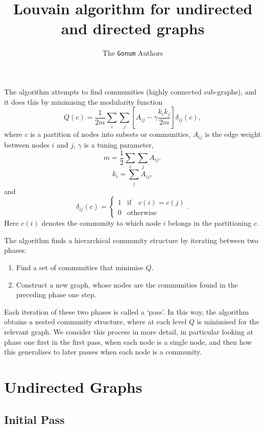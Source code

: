 \documentclass{article}
\title{Louvain algorithm for undirected and directed graphs}
\author{The {\tt Gonum} Authors}
\begin{document}
\maketitle

The algorithm attempts to find communities (highly connected sub-graphs),
and it does this by minimising the modularity function
\begin{equation}
	Q(c) = \frac{1}{2m}\sum_i\sum_j\left[ A_{ij} - \gamma \frac{k_ik_j}{2m} \right] \delta_{ij}(c),
\end{equation}
where $c$ is a partition of nodes into subsets or communities,
$A_{ij}$ is the edge weight between nodes $i$ and $j$, 
$\gamma$ is a tuning parameter,
\begin{equation}
m = \frac{1}{2}\sum_i\sum_jA_{ij},
\end{equation}
\begin{equation}
k_i = \sum_j{A_{ij}},
\end{equation}
and 
\begin{equation}
	\delta_{ij}(c) = \left \{ \begin{array}{ll}
	1 & \text{if} \quad  c(i) = c(j) \\
	0 & \text{otherwise} \end{array} \right ..
\end{equation}
Here $c(i)$ denotes the community to which node $i$ belongs 
in the partitioning $c$.

The algorithm finds a hierarchical community structure by iterating 
between two phases:
\begin{enumerate}
	\item Find a set of communities that minimise $Q$.
	\item Construct a new graph, whose nodes are the communities 
	found in the preceding phase one step.
\end{enumerate}
Each iteration of these two phases is called a `pass'.
In this way, the algorithm obtains a nested community structure, 
where at each level $Q$ is minimised for the relevant graph.
We consider this process in more detail, in particular looking 
at phase one first in the first pass, when each node is a single
node, and then how this generalises to later passes when each node 
is a community.

\section{Undirected Graphs}

\subsection{Initial Pass}
\label{sec:initialPass}
\end{document}
